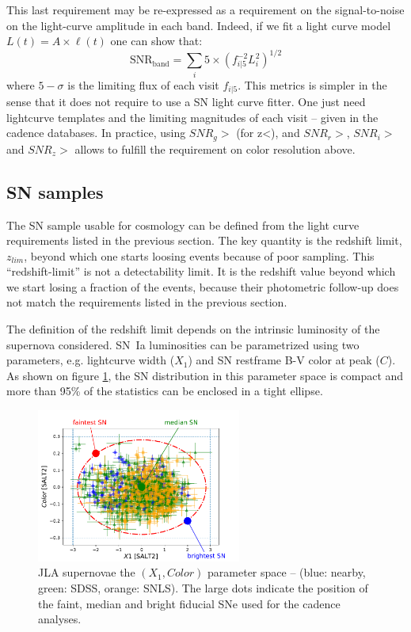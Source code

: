 \documentclass [11pt,a4paper]{article}
\begin{document}
This last requirement may be re-expressed as a requirement on the
signal-to-noise on the light-curve amplitude in each band. Indeed, if
we fit a light curve model $L(t) = A \times \ell(t)$ one can show
that:
\begin{equation}
\mathrm{SNR_{band}} = \sum_{i} 5 \times (f^{-2}_{i|5} L_i^2)^{1/2}\label{eqn:snr}
\end{equation} 
where $5-\sigma$ is the limiting flux of each visit $f_{i|5}$.
This metrics is simpler in the sense that it does not require to use a
SN light curve fitter. One just need lightcurve templates and the
limiting magnitudes of each visit -- given in the cadence
databases. In practice, using $SNR_g > $ (for z<), and $SNR_r > $,
$SNR_i > $ and $SNR_z > $ allows to fulfill the requirement on color
resolution above.


\subsection{SN samples}

The SN sample usable for cosmology can be defined from the light curve
requirements listed in the previous section. The key quantity is the
redshift limit, $z_{lim}$, beyond which one starts loosing events
because of poor sampling.  This ``redshift-limit'' is not a
detectability limit.  It is the redshift value beyond which we start
losing a fraction of the events, because their photometric follow-up
does not match the requirements listed in the previous section.

The definition of the redshift limit depends on the intrinsic
luminosity of the supernova considered.  SN~Ia luminosities can be
parametrized using two parameters, e.g. lightcurve width ($X_1$) and
SN restframe B-V color at peak ($C$).  As shown on figure
\ref{fig:jla_X1_C}, the SN distribution in this parameter space is
compact and more than 95\% of the statistics can be enclosed in a
tight ellipse. 

\begin{figure}
  \begin{center}
    \includegraphics[width=0.6\textwidth]{Figures/sn_parameter_space.pdf}
    \caption{JLA supernovae the $(X_1,Color)$ parameter space --
      (blue: nearby, green: SDSS, orange: SNLS).  The large dots
      indicate the position of the faint, median and bright fiducial
      SNe used for the cadence analyses.}
    \label{fig:jla_X1_C}
  \end{center}
\end{figure}
\end{document}
